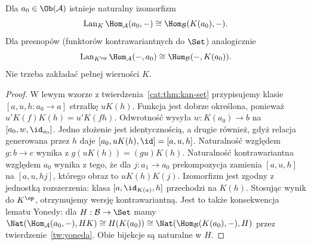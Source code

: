 \begin{stwierdzenie}\label{cat:prop:kan-representables}
Dla $a_0\in\Ob(\mathcal A)$ istnieje naturalny izomorfizm
\[
 \operatorname{Lan}_K\Hom_{\mathcal A}(a_0,-)
 \cong\Hom_{\mathcal B}(K(a_0),-).
\]
Dla presnopów (funktorów kontrawariantnych do $\Set$) analogicznie
\[
 \operatorname{Lan}_{K^{\op}}\Hom_{\mathcal A}(-,a_0)
 \cong\Hom_{\mathcal B}(-,K(a_0)).
\]
Nie trzeba zakładać pełnej wierności $K$.
\end{stwierdzenie}
\begin{proof}
W lewym wzorze z twierdzenia~\ref{cat:thm:kan-set} przypisujemy klasie $[a,u,h:a_0\to a]$ strzałkę $uK(h)$. Funkcja jest dobrze określona, ponieważ $u'K(f)K(h)=u'K(fh)$. Odwrotność wysyła $w:K(a_0)\to b$ na $[a_0,w,\id_{a_0}]$. Jedno złożenie jest identycznością, a drugie również, gdyż relacja generowana przez $h$ daje $[a_0,uK(h),\id]=[a,u,h]$. Naturalność względem $g:b\to c$ wynika z $g(uK(h))=(gu)K(h)$. Naturalność kontrawariantna względem $a_0$ wynika z tego, że dla $j:a_1\to a_0$ prekompozycja zamienia $[a,u,h]$ na $[a,u,hj]$, którego obraz to $uK(h)K(j)$. Izomorfizm jest zgodny z jednostką rozszerzenia: klasa $[a,\id_{K(a)},h]$ przechodzi na $K(h)$. Stosując wynik do $K^{\op}$, otrzymujemy wersję kontrawariantną. Jest to także konsekwencja lematu Yonedy: dla $H:\mathcal B\to\Set$ mamy $\Nat(\Hom_{\mathcal A}(a_0,-),HK)\cong H(K(a_0))\cong\Nat(\Hom_{\mathcal B}(K(a_0),-),H)$ przez twierdzenie~\ref{tw:yoneda}. Obie bijekcje są naturalne w $H$.
\end{proof}

